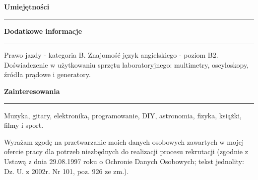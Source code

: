 \documentclass{article}
\newcommand{\wielkoscnnaglowkow}{\large}
\newcommand{\naglowek}[1] 
{
	\textbf{\wielkoscnnaglowkow #1}
	\vspace{0.005\textheight}
	\hrule 
	\vspace{0.005\textheight}
}
\begin{document}
\naglowek{Umiejętności}

\naglowek{Dodatkowe informacje}
Prawo jazdy - kategoria B.
Znajomość język angielskiego - poziom B2.\\
Doświadczenie w użytkowaniu sprzętu laboratoryjnego: multimetry, oscyloskopy, źródła prądowe i generatory.


\naglowek{Zainteresowania}
Muzyka, gitary, elektronika, programowanie, DIY, astronomia, fizyka, książki, filmy i sport.
\vspace{0.05\textheight}
\noindent\newline
\scriptsize
\begin{minipage}{\textwidth} 

Wyrażam zgodę na przetwarzanie moich danych osobowych zawartych w mojej ofercie pracy dla potrzeb niezbędnych do realizacji procesu rekrutacji (zgodnie z Ustawą z dnia 29.08.1997 roku o Ochronie Danych Osobowych; tekst jednolity: Dz. U. z 2002r. Nr 101, poz. 926 ze zm.).
\end{minipage}
\end{document}
